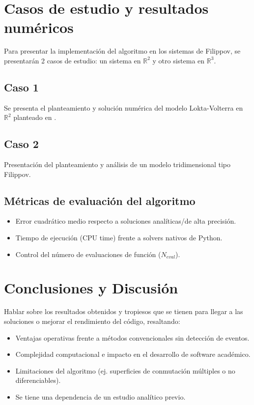 \documentclass[12pt,letterpaper]{article}
\begin{document}
\section{Casos de estudio y resultados numéricos}
Para presentar la implementación del algoritmo en los sistemas de Filippov, se presentarán 2 casos de estudio: un sistema en $\mathbb{R}^2$ y otro sistema en $\mathbb{R}^3$.
\subsection{Caso 1}
Se presenta el planteamiento y solución numérica del modelo Lokta-Volterra en $\mathbb{R}^2$ planteado en \cite{kuznetsov2003one}.
\subsection{Caso 2}
Presentación del planteamiento y análisis de un modelo tridimensional tipo Filippov.
\subsection{Métricas de evaluación del algoritmo}
\begin{itemize}
    \item Error cuadrático medio respecto a soluciones analíticas/de alta precisión.
    \item Tiempo de ejecución (CPU time) frente a solvers nativos de Python.
    \item Control del número de evaluaciones de función ($N_{eval}$).
\end{itemize}

\section{Conclusiones y Discusión}
Hablar sobre los resultados obtenidos y tropiesos que se tienen para llegar a las soluciones o mejorar el rendimiento del código, resaltando:
\begin{itemize}
    \item Ventajas operativas frente a métodos convencionales sin detección de eventos.
    \item Complejidad computacional e impacto en el desarrollo de software académico.
    \item Limitaciones del algoritmo (ej. superficies de conmutación múltiples o no diferenciables).
    \item Se tiene una dependencia de un estudio analítico previo.
\end{itemize}

\printbibliography[title={Referencias}] 
\end{document}
